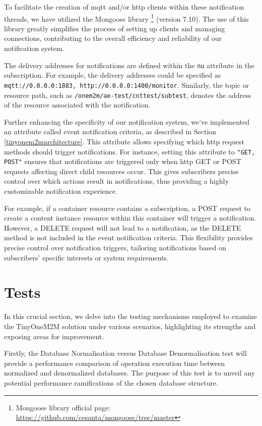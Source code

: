 \documentclass[a4paper,fleqn]{cas-dc}
\begin{document}
To facilitate the creation of \gls{mqtt} and/or \gls{http} clients within these notification threads, we have utilized the Mongoose library \footnote{Mongoose library official page: \url{https://github.com/cesanta/mongoose/tree/master}} (version 7.10). The use of this library greatly simplifies the process of setting up clients and managing connections, contributing to the overall efficiency and reliability of our notification system.

The delivery addresses for notifications are defined within the \texttt{nu} attribute in the subscription. For example, the delivery addresses could be specified as \texttt{mqtt://0.0.0.0:1883, http://0.0.0.0:1400/monitor}. Similarly, the topic or resource path, such as \texttt{/onem2m/ae-test/cnttest/subtest}, denotes the address of the resource associated with the notification.

Further enhancing the specificity of our notification system, we've implemented an attribute called event notification criteria, as described in Section \ref{tinyonem2marchitecture}. This attribute allows specifying which \gls{http} request methods should trigger notifications. For instance, setting this attribute to \texttt{"GET, POST"} ensures that notifications are triggered only when \gls{http} GET or POST requests affecting direct child resources occur. This gives subscribers precise control over which actions result in notifications, thus providing a highly customizable notification experience. 

For example, if a container resource contains a subscription, a POST request to create a content instance resource within this container will trigger a notification. However, a DELETE request will not lead to a notification, as the DELETE method is not included in the event notification criteria. This flexibility provides precise control over notification triggers, tailoring notifications based on subscribers' specific interests or system requirements.

\section{Tests}
\label{tests}

In this crucial section, we delve into the testing mechanisms employed to examine the TinyOneM2M solution under various scenarios, highlighting its strengths and exposing areas for improvement.

Firstly, the Database Normalisation versus Database Denormalisation test will provide a performance comparison of operation execution time between normalized and denormalized databases. The purpose of this test is to unveil any potential performance ramifications of the chosen database structure.
\end{document}
